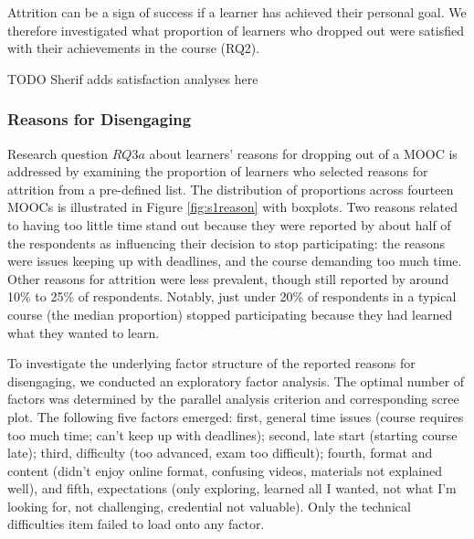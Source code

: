 \documentclass{sigchi}\usepackage[]{graphicx}\usepackage[]{color}
\begin{document}
Attrition can be a sign of success if a learner has achieved their personal goal. We therefore investigated what proportion of learners who dropped out were satisfied with their achievements in the course (RQ2). 

TODO Sherif adds satisfaction analyses here

\subsubsection{Reasons for Disengaging}

Research question $RQ3a$ about learners' reasons for dropping out of a MOOC is addressed by examining the proportion of learners who selected reasons for attrition from a pre-defined list. The distribution of proportions across fourteen MOOCs is illustrated in Figure \ref{fig:s1reason} with boxplots. Two reasons related to having too little time stand out because they were reported by about half of the respondents as influencing their decision to stop participating: the reasons were issues keeping up with deadlines, and the course demanding too much time. Other reasons for attrition were less prevalent, though still reported by around 10\% to 25\% of respondents. Notably, just under 20\% of respondents in a typical course (the median proportion) stopped participating because they had learned what they wanted to learn.

To investigate the underlying factor structure of the reported reasons for disengaging, we conducted an exploratory factor analysis. The optimal number of factors was determined by the parallel analysis criterion and corresponding scree plot. The following five factors emerged: first, general time issues (course requires too much time; can't keep up with deadlines); second, late start (starting course late); third, difficulty (too advanced, exam too difficult); fourth, format and content (didn't enjoy online format, confusing videos, materials not explained well), and fifth, expectations (only exploring, learned all I wanted, not what I'm looking for, not challenging, credential not valuable). Only the technical difficulties item failed to load onto any factor.
\end{document}
